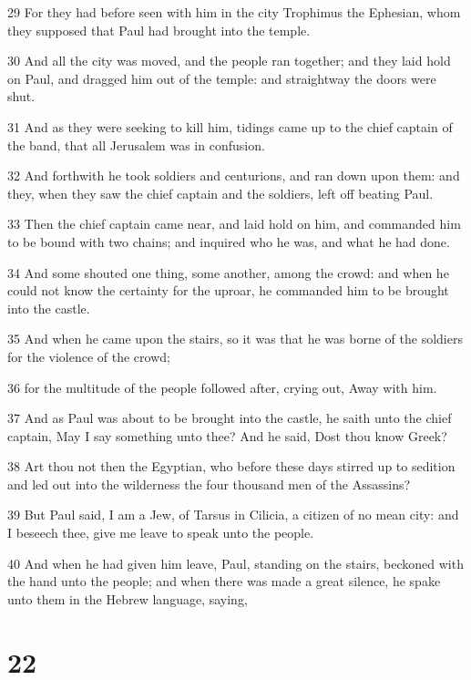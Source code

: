 \par 29 For they had before seen with him in the city Trophimus the Ephesian, whom they supposed that Paul had brought into the temple.
\par 30 And all the city was moved, and the people ran together; and they laid hold on Paul, and dragged him out of the temple: and straightway the doors were shut.
\par 31 And as they were seeking to kill him, tidings came up to the chief captain of the band, that all Jerusalem was in confusion.
\par 32 And forthwith he took soldiers and centurions, and ran down upon them: and they, when they saw the chief captain and the soldiers, left off beating Paul.
\par 33 Then the chief captain came near, and laid hold on him, and commanded him to be bound with two chains; and inquired who he was, and what he had done.
\par 34 And some shouted one thing, some another, among the crowd: and when he could not know the certainty for the uproar, he commanded him to be brought into the castle.
\par 35 And when he came upon the stairs, so it was that he was borne of the soldiers for the violence of the crowd;
\par 36 for the multitude of the people followed after, crying out, Away with him.
\par 37 And as Paul was about to be brought into the castle, he saith unto the chief captain, May I say something unto thee? And he said, Dost thou know Greek?
\par 38 Art thou not then the Egyptian, who before these days stirred up to sedition and led out into the wilderness the four thousand men of the Assassins?
\par 39 But Paul said, I am a Jew, of Tarsus in Cilicia, a citizen of no mean city: and I beseech thee, give me leave to speak unto the people.
\par 40 And when he had given him leave, Paul, standing on the stairs, beckoned with the hand unto the people; and when there was made a great silence, he spake unto them in the Hebrew language, saying,

\chapter{22}

